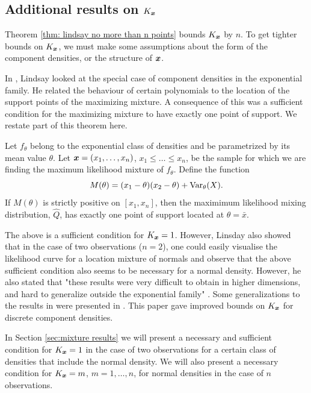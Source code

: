 	\subsection{Additional results on \texorpdfstring{$K_{\bm{{x}}}$}{Kx}}

	Theorem \ref{thm: lindsay no more than n points} bounds $K_{\bm{{x}}}$ by $n$. To get tighter bounds on $K_{\bm{{x}}}$, we must make some assumptions about the form of the component densities, or the structure of ${\bm{{x}}}$.

	In \cite{Lindsay1983a-he}, Lindsay looked at the special case of  component densities in the exponential family. He related the behaviour of certain polynomials to the location of the support points of the maximizing mixture. A consequence of this was a sufficient condition for the maximizing mixture to have exactly one point of support. We restate part of this theorem here.

	\begin{theorem}
	\label{thm:exponential family k=1 bound}
		Let $f_\theta$ belong to the exponential class of densities and be parametrized by its mean value $\theta$. Let ${\bm{{x}}} = (x_1, \dots, x_n)$, $x_1 \leq \dots \leq x_n$, be the sample for which we are finding the maximum likelihood mixture of $f_\theta$. Define the function
		\begin{equation}
			M(\theta) = (x_1 - \theta)(x_2 - \theta) + \mathrm{Var}_\theta(X).
		\end{equation}
		If $M(\theta)$ is strictly positive on $[x_1, x_n]$, then the maximimum likelihood mixing distribution, $\hat{Q}$, has exactly one point of support located at $\theta = \bar{x}$.
	\end{theorem}

	The above is a sufficient condition for $K_{\bm{{x}}} = 1$. However, Linsday also showed that in the case of two observations ($n=2$), one could easily visualise the likelihood curve for a location mixture of normals and observe that the above sufficient condition also seems to be necessary for a normal density. However, he also stated that "these results were very difficult to obtain in higher dimensions, and hard to generalize outside the exponential family" \cite{Lindsay1995-sq}. Some generalizations to the results in \cite{Lindsay1983a-he} were presented in \cite{Lindsay1993-rj}. This paper gave improved bounds on $K_{\bm{{x}}}$ for discrete component densities.

	In Section \ref{sec:mixture results} we will present a necessary and sufficient condition for $K_{\bm{{x}}} = 1$ in the case of two observations for a certain class of densities that include the normal density. We will also present a necessary condition for $K_{\bm{{x}}} = m$, $m = 1, \dots, n$, for normal densities in the case of $n$ observations.


